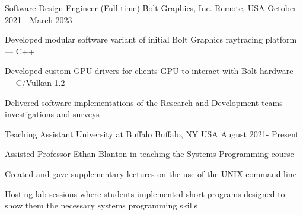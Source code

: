 

\begin{cventries}

  \cventry
    {Software Design Engineer (Full-time)} %
    {\href{https://www.bolt.graphics/}{Bolt Graphics, Inc.} } %
    {Remote, USA} %
    {October 2021 - March 2023} %
    {
      \begin{cvitems} %
        \item Developed modular software variant of initial Bolt Graphics raytracing platform --- C++
        \item Developed custom GPU drivers for clients GPU to interact with Bolt hardware --- C/Vulkan 1.2
        \item Delivered software implementations of the Research and Development teams investigations and surveys
      \end{cvitems}
    }
  \cventry
    {Teaching Assistant} %
    {University at Buffalo} %
    {Buffalo, NY USA} %
    {August 2021- Present} %
    {
      \begin{cvitems} %
        \item Assisted Professor Ethan Blanton in teaching the Systems Programming course
        \item Created and gave supplementary lectures on the use of the UNIX command line
        \item Hosting lab sessions where students implemented short programs designed to show them the necessary systems programming skills
      \end{cvitems}
    }

\end{cventries}

